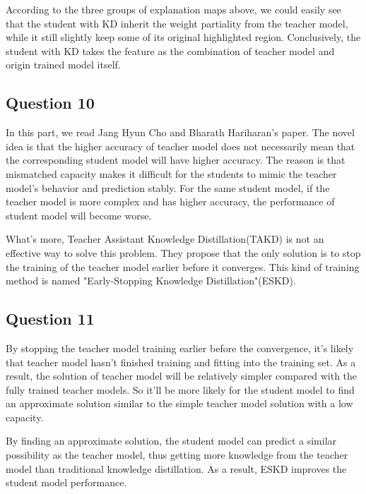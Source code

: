 \documentclass[conference]{IEEEtran}
\begin{document}
  According to the three groups of explanation maps above, we could easily see that the student with KD inherit the weight partiality from the teacher model, while it still slightly keep some of its original highlighted region. Conclusively, the student with KD takes the feature as the combination of teacher model and origin trained model itself.
  
  \subsection{Question 10}
  In this part, we read Jang Hyun Cho and Bharath Hariharan's\cite{b2} paper. The novel idea is that the higher accuracy of teacher model does not necessarily mean that the corresponding student model will have higher accuracy. The reason is that mismatched capacity makes it difficult for the students to mimic the teacher model's behavior and prediction stably. For the same student model, if the teacher model is more complex and has higher accuracy, the performance of student model will become worse.\par
  What's more, Teacher Assistant Knowledge Distillation(TAKD) is not an effective way to solve this problem. They propose that the only solution is to stop the training of the teacher model earlier before it converges. This kind of training method is named "Early-Stopping Knowledge Distillation"(ESKD).
  
  \subsection{Question 11}
  By stopping the teacher model training earlier before the convergence, it's likely that teacher model hasn't finished training and fitting into the training set. As a result, the solution of teacher model will be relatively simpler compared with the fully trained teacher models. So it'll be more likely for the student model to find an approximate solution similar to the simple teacher model solution with a low capacity.\par
  By finding an approximate solution, the student model can predict a similar possibility as the teacher model, thus getting more knowledge from the teacher model than traditional knowledge distillation.
  As a result, ESKD improves the student model performance.
\end{document}

